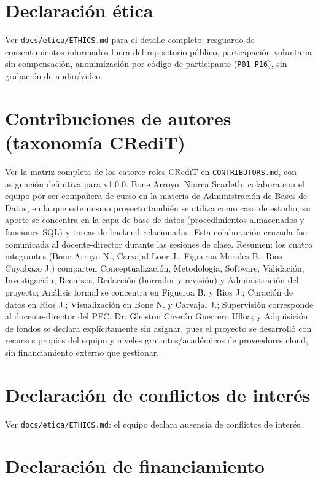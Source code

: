 \section{Declaración ética}

Ver \texttt{docs/etica/ETHICS.md} para el detalle completo: resguardo de
consentimientos informados fuera del repositorio público, participación
voluntaria sin compensación, anonimización por código de participante
(\texttt{P01}--\texttt{P16}), sin grabación de audio/video.

\section{Contribuciones de autores (taxonomía CRediT)}

Ver la matriz completa de los catorce roles CRediT en
\texttt{CONTRIBUTORS.md}, con asignación definitiva para v1.0.0. Bone
Arroyo, Niurca Scarleth, colabora con el equipo por ser compañera de
curso en la materia de Administración de Bases de Datos, en la que este
mismo proyecto también se utiliza como caso de estudio; su aporte se
concentra en la capa de base de datos (procedimientos almacenados y
funciones SQL) y tareas de backend relacionadas. Esta colaboración
cruzada fue comunicada al docente-director durante las sesiones de
clase. Resumen:
los cuatro integrantes (Bone Arroyo N., Carvajal Loor J., Figueroa
Morales B., Rios Cuyabazo J.) comparten Conceptualización, Metodología,
Software, Validación, Investigación, Recursos, Redacción (borrador y
revisión) y Administración del proyecto; Análisis formal se concentra en
Figueroa B. y Rios J.; Curación de datos en Rios J.; Visualización en
Bone N. y Carvajal J.; Supervisión corresponde al docente-director del
PFC, Dr. Gleiston Cicerón Guerrero Ulloa; y Adquisición de fondos se
declara explícitamente sin asignar, pues el proyecto se desarrolló con
recursos propios del equipo y niveles gratuitos/académicos de
proveedores cloud, sin financiamiento externo que gestionar.

\section{Declaración de conflictos de interés}

Ver \texttt{docs/etica/ETHICS.md}: el equipo declara ausencia de
conflictos de interés.

\section{Declaración de financiamiento}


